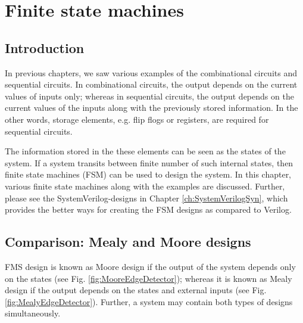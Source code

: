 \chapter{Finite state machines} \label{ch:FSM}

\graphicspath{{Chapters/FSM/Figures/}}


\section{Introduction}
In previous chapters, we saw various examples of the combinational circuits and sequential circuits. In combinational circuits, the output depends on the current values of inputs only; whereas in sequential circuits, the output depends on the current values of the inputs along with the previously stored information. In the other words, storage elements, e.g. flip flogs or registers, are required for sequential circuits. 

The information stored in the these elements can be seen as the states of the system. If a system transits between finite number of such internal states, then finite state machines (FSM) can be used to design the system. In this chapter, various finite state machines along with the examples are discussed. Further, please see the SystemVerilog-designs in Chapter \ref{ch:SystemVerilogSyn}, which provides the better ways for creating the FSM designs as compared to Verilog. 

\section{Comparison: Mealy and Moore designs}\label{sec:MealyMooreDesign}
FMS design is known as Moore design if the output of the system depends only on the states (see Fig. \ref{fig:MooreEdgeDetector}); whereas it is known as Mealy design if the output depends on the states and external inputs (see Fig. \ref{fig:MealyEdgeDetector}). Further, a system may contain both types of designs simultaneously.


